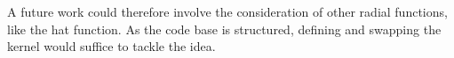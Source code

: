 \documentclass[12pt]{report} %
\begin{document}
\begin{itemize}
  A future work could therefore involve the consideration of other radial functions, like the hat function. As the code base is structured, defining and swapping the kernel would suffice to tackle the idea.

\end{itemize}


\clearpage


\printbibliography




\end{document}
